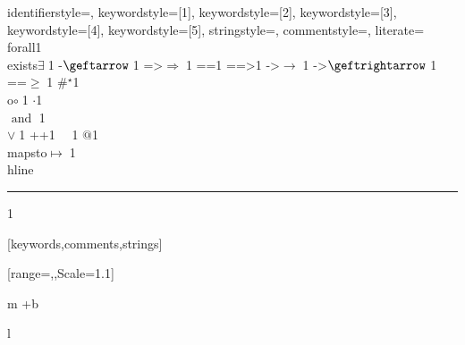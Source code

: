 {    %
    identifierstyle={\ttfamily\color{black}},
    keywordstyle=[1]{\ttfamily\color{dkviolet}},
    keywordstyle=[2]{\ttfamily\color{dkgreen}},
    keywordstyle=[3]{\ttfamily\color{ltblue}},
    keywordstyle=[4]{\ttfamily\color{dkblue}},
    keywordstyle=[5]{\ttfamily\color{dkred}},
    stringstyle=\ttfamily,
    commentstyle={\ttfamily\color{dkgreen}},
    literate=
    {\\forall}{{\color{dkgreen}{$\forall\;$}}}1
    {\\exists}{{$\exists\;$}}1
    {\ge -}{{$\geftarrow\;$}}1
    {=>}{{$\Rightarrow\;$}}1
    {==}{{\code{==}\;}}1
    {==>}{{\code{==>}\;}}1
    {->}{{$\rightarrow\;$}}1
    {\ge ->}{{$\geftrightarrow\;$}}1
    {\ge ==}{{$\geq\;$}}1
    {\#}{{$^\star$}}1 
    {\\o}{{$\circ\;$}}1 
    {\@}{{$\cdot$}}1 
    {\/\\}{{$\text{ and }\;$}}1
    {\\\/}{{$\vee\;$}}1
    {++}{{\code{++}}}1
    {~}{{\ }}1
    {\@\@}{{$@$}}1
    {\\mapsto}{{$\mapsto\;$}}1
    {\\hline}{{\rule{\linewidth}{0.5pt}}}1
}[keywords,comments,strings]

\usepackage{amssymb,amsmath,mathtools}
\usepackage[math-style=TeX,bold-style=TeX]{unicode-math}
\setlength{\fboxsep}{10pt}
\setlength{\fboxrule}{0.4pt}

\setmainfont{Libertinus Serif}
[range={\lbrace,\rbrace},Scale=1.1]

\usepackage{galois}
\usepackage{ebproof}
\ExplSyntaxOn
{}
 { m +b }
  {
    \begin{@ruleenv}{l}
       \\
    \end{@ruleenv}
  }
  {}
\ExplSyntaxOff

